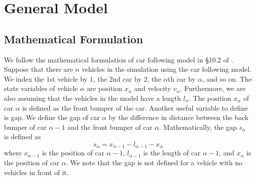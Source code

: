 \documentclass[12pt]{article}
\begin{document}
    \section{General Model}
    \subsection{Mathematical Formulation}\label{ch1}
        We follow the mathematical formulation of car following model in \S 10.2 of \cite{traffic}. Suppose that there are $n$ vehicles in the simulation using the car following model. We index the $1$st vehicle by $1$, the $2$nd car by $2$, the $\alpha$th car by $\alpha$, and so on. The state variables of vehicle $\alpha$ are position $x_\alpha$ and velocity $v_\alpha$. Furthermore, we are also assuming that the vehicles in the model have a length $l_{\alpha}$. The position $x_\alpha$ of car $\alpha$ is defined as the front bumper of the car. Another useful variable to define is gap. We define the gap of car $\alpha$ by the difference in distance between the back bumper of car $\alpha - 1$ and the front bumper of car $\alpha$. Mathematically, the gap $s_\alpha$ is defined as 
        \begin{equation} 
          s_\alpha = x_{\alpha - 1} - l_{\alpha -1}  - x_{\alpha}
        \end{equation}
        where $x_{\alpha - 1}$ is the position of car $\alpha - 1$, $l_{\alpha - 1}$ is the length of car $\alpha - 1$, and $x_\alpha$ is the position of car $\alpha$. We note that the gap is not defined for a vehicle with no vehicles in front of it. 
\end{document}
